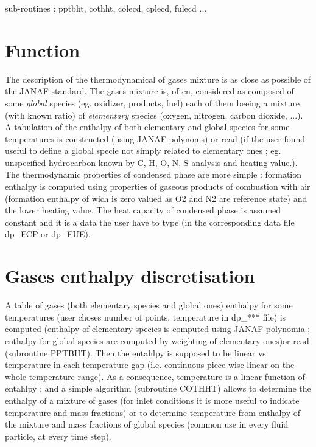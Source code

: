 {\huge sub-routines : pptbht, cothht, colecd, cplecd, fulecd ...}

\section{Function}

The description of the thermodynamical of gases mixture is as close as possible of the JANAF standard. The gases mixture is, often, considered as composed of some {\em global} species ({\small eg. oxidizer, products, fuel}) each of them beeing a mixture ({\small with known ratio}) of {\em elementary} species ({\small oxygen, nitrogen, carbon dioxide, ...}).\\
 A tabulation of the enthalpy of both elementary and global species for some temperatures is constructed ({\small using JANAF polynoms}) or read ({\small if the user found useful to define a global specie not simply related to elementary ones ; eg. unspecified hydrocarbon known by C, H, O, N, S analysis and heating value.}).\\ 
The thermodynamic properties of condensed phase are more simple : formation enthalpy is computed using properties of gaseous products of combustion with air ({\small formation enthalpy of wich is zero valued as O2 and N2 are reference state}) and the lower heating value. The heat capacity of condensed phase is assumed constant and it is a data the user have to type ({\small in the corresponding data file dp\_FCP or dp\_FUE}).


\section{Gases enthalpy discretisation}

A table of gases ({\small both elementary species and global ones}) enthalpy for some temperatures ({\small user choses number of points, temperature in dp\_*** file}) is computed ({\small enthalpy of elementary species is computed using JANAF polynomia ; enthalpy for global species are computed by weighting of elementary ones})or read ({\small subroutine PPTBHT}). Then the entahlpy is supposed to be linear vs. temperature in each temperature gap ({\small i.e. continuous piece wise linear on the whole temperature range}). As a consequence, temperature is a linear function of entahlpy ; and a simple algorithm ({\small subroutine COTHHT}) allows to determine the enthalpy of a mixture of gases ({\small for inlet conditions it is more useful to indicate temperature and mass fractions}) or to determine temperature from enthalpy of the mixture and mass fractions of global species ({\small common use in every fluid particle, at every time step}). 
